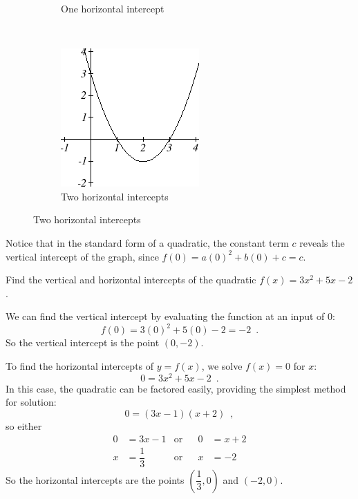 \begin{figure}[!ht]
\begin{subfigure}[b]{0.3\textwidth}
        \caption{One horizontal intercept}
    \end{subfigure}
    ~
    \begin{subfigure}[b]{0.3\textwidth}
        \includegraphics[width=\textwidth]{img/chap1/sec1-5/image060.png}
        \caption{Two horizontal intercepts}
    \end{subfigure}
\end{figure}

Notice that in the standard form of a quadratic, the constant term $c$ reveals the vertical intercept of the graph, since $f(0)=a(0)^2+b(0)+c=c$.

\begin{example}
Find the vertical and horizontal intercepts of the quadratic $f(x)=3x^2+5x-2$.

\begin{solution} We can find the vertical intercept by evaluating the function at an input of $0$:
$$f(0)=3(0)^2+5(0)-2=-2 \enspace .$$
So the vertical intercept is the point $(0,-2)$.

To find the horizontal intercepts of $y=f(x)$, we solve $f(x) = 0$ for $x$:
$$0=3x^2+5x-2 \enspace .$$
In this case, the quadratic can be factored easily, providing the simplest method for solution:
$$0=(3x-1)(x+2) \enspace ,$$
so either
\begin{align*}
		0 &= 3x-1&         \mbox{or}& &0 &= x+2\\
		x &= \dfrac{1}{3}& \mbox{or}& &x &= -2
	\end{align*}
So the horizontal intercepts are the points $\left(\dfrac{1}{3},0\right)$ and $(-2,0)$.
\end{solution}\end{example}

